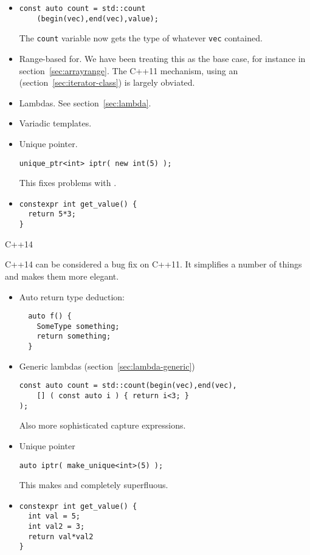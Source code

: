 \begin{itemize}
\item {}
\begin{lstlisting}
const auto count = std::count
    (begin(vec),end(vec),value);
\end{lstlisting}
The \lstinline{count} variable now gets the type of whatever
\lstinline{vec} contained.

\item  Range-based for. We have been treating this as the base case,
  for instance in section~\ref{sec:arrayrange}. The C++11 mechanism,
  using an  (section~\ref{sec:iterator-class}) is
  largely obviated.

\item Lambdas. See section~\ref{sec:lambda}.

\item Variadic templates.

\item Unique pointer. 
\begin{lstlisting}
unique_ptr<int> iptr( new int(5) );    
\end{lstlisting}
This fixes problems with .

\item {}
\begin{lstlisting}
constexpr int get_value() {
  return 5*3;
}
\end{lstlisting}
\end{itemize}


 {C++14}

C++14 can be considered a bug fix on C++11.
It simplifies a number of things and makes them more elegant.

\begin{itemize}
\item
  Auto return type deduction:
\begin{lstlisting}
  auto f() {
    SomeType something;
    return something;
  }
\end{lstlisting}

\item Generic lambdas (section~\ref{sec:lambda-generic})
\begin{lstlisting}
const auto count = std::count(begin(vec),end(vec),
    [] ( const auto i ) { return i<3; }    
);
\end{lstlisting}
Also more sophisticated capture expressions.

\item Unique pointer
\begin{lstlisting}
auto iptr( make_unique<int>(5) );    
\end{lstlisting}
This makes  and  completely superfluous.

\item {}
\begin{lstlisting}
constexpr int get_value() {
  int val = 5;
  int val2 = 3;
  return val*val2
}
\end{lstlisting}
\end{itemize}

